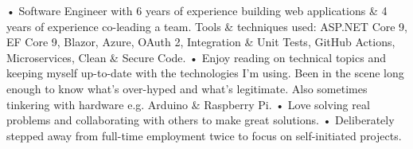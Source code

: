 

\begin{cvparagraph}

• Software Engineer with 6 years of experience building web applications \& 4 years of experience co-leading a team. Tools \& techniques used: ASP.NET Core 9, EF Core 9, Blazor, Azure, OAuth 2, Integration \& Unit Tests, GitHub Actions, Microservices, Clean \& Secure Code.
\newline
• Enjoy reading on technical topics and keeping myself up-to-date with the technologies I'm using. Been in the scene long enough to know what's over-hyped and what's legitimate. Also sometimes tinkering with hardware e.g. Arduino \& Raspberry Pi.
\newline
• Love solving real problems and collaborating with others to make great solutions.
\newline
• Deliberately stepped away from full-time employment twice to focus on self-initiated projects.
\end{cvparagraph}
